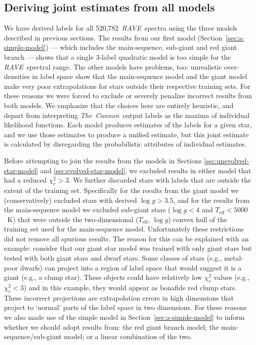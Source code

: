 \documentclass[preprint,trackchanges]{aastex}
\newcommand{\acronym}[1]{{\small{#1}}}
\newcommand{\project}[1]{\textsl{#1}}
\newcommand{\thecannon}{\project{The~Cannon}}
\newcommand{\rave}{\project{\acronym{RAVE}}}
\newcommand{\teff}{T_{\mathrm{eff}}}
\newcommand{\logg}{\log g}
\newcommand{\Nspectra}{520,782}
\begin{document}
\subsection{Deriving joint estimates from all models}
\label{sec:joining-the-models}


We have derived labels for all \Nspectra\ \rave\ spectra using the three models
described in previous sections.  The results from our first model 
(Section~\ref{sec:a-simple-model}) --- which includes the main-sequence, sub-giant 
and red giant branch --- shows that a single 3-label quadratic model is too simple 
for the \rave\ spectral range.   The other models have problems, too: unrealistic 
over-densities in label space show that the main-sequence model and the giant model
make very poor extrapolations for stars outside their respective training sets.  
For these reasons we were forced to exclude or severely penalize incorrect results
from both models.  We emphasize that the choices here are entirely heuristic, 
and depart from interpreting \thecannon\ output labels as the maxima of individual 
likelihood functions.  Each model produces estimates of the labels for a given star, 
and we use those estimates to produce a unified estimate, but this joint estimate 
is calculated by disregarding the probabilistic attributes of individual estimates.


Before attempting to join the results from the models in Sections 
\ref{sec:unevolved-star-model} and \ref{sec:evolved-star-model}, we excluded results
in either model that had a reduced $\chi_{r}^2 > 3$.  We further discarded stars with
labels that are outside the extent of the training set.  Specifically for the
results from the giant model we (conservatively) excluded stars with derived 
$\logg > 3.5$, and for the results from the main-sequence model we excluded 
sub-giant stars ($\logg < 4$ and $\teff < 5000$~K) that were outside the two-dimensional 
($\teff$, $\logg$) convex hull of the training set used for the main-sequence model.  
Unfortunately these restrictions did not remove all spurious results.  The reason 
for this can be explained with an example:  consider that our giant star model was 
trained with only giant stars but tested with both giant stars and dwarf stars.  
Some classes of stars (e.g., metal-poor dwarfs) can project into a region of label 
space that would suggest it is a giant (e.g., a clump star).  These objects could 
have relatively low $\chi_{r}^2$ values (e.g., $\chi_{r}^2 < 3$) and in this example,
they would appear as bonafide red clump stars.  These incorrect projections are 
extrapolation errors in high dimensions that project to `normal' parts of the label 
space in two dimensions.  For these reasons we also made use of the simple model in 
Section~\ref{sec:a-simple-model} to inform whether we should adopt results from: 
the red giant branch model; the main-sequence/sub-giant model; or a linear combination 
of the two. 
\end{document}
